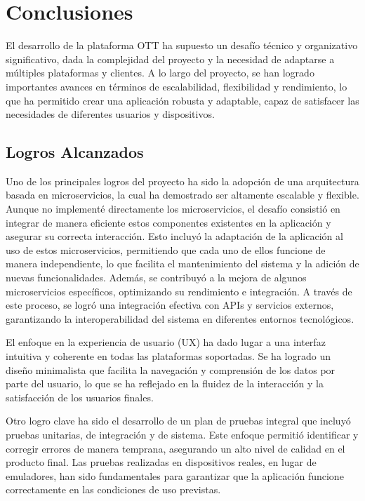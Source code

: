\chapter{Conclusiones}
\label{chap:conclusiones}

El desarrollo de la plataforma OTT ha supuesto un desafío técnico y organizativo significativo, dada la complejidad del 
proyecto y la necesidad de adaptarse a múltiples plataformas y clientes. A lo largo del proyecto, se han logrado 
importantes avances en términos de escalabilidad, flexibilidad y rendimiento, lo que ha permitido crear una aplicación 
robusta y adaptable, capaz de satisfacer las necesidades de diferentes usuarios y dispositivos.

\section{Logros Alcanzados}
\label{sec:conclusiones:logros}

Uno de los principales logros del proyecto ha sido la adopción de una arquitectura basada en microservicios, 
la cual ha demostrado ser altamente escalable y flexible. Aunque no implementé directamente los microservicios, el 
desafío consistió en integrar de manera eficiente estos componentes existentes en la aplicación y asegurar su correcta 
interacción. Esto incluyó la adaptación de la aplicación al uso de estos microservicios, permitiendo que cada uno de 
ellos funcione de manera independiente, lo que facilita el mantenimiento del sistema y la adición de nuevas funcionalidades.
Además, se contribuyó a la mejora de algunos microservicios específicos, optimizando su rendimiento e integración. 
A través de este proceso, se logró una integración efectiva con APIs y servicios externos, garantizando la interoperabilidad 
del sistema en diferentes entornos tecnológicos.

El enfoque en la experiencia de usuario (UX) ha dado lugar a una interfaz intuitiva y coherente en todas las plataformas 
soportadas. Se ha logrado un diseño minimalista que facilita la navegación y comprensión de los datos por parte del usuario, 
lo que se ha reflejado en la fluidez de la interacción y la satisfacción de los usuarios finales.

Otro logro clave ha sido el desarrollo de un plan de pruebas integral que incluyó pruebas unitarias, de integración y de 
sistema. Este enfoque permitió identificar y corregir errores de manera temprana, asegurando un alto nivel de calidad 
en el producto final. Las pruebas realizadas en dispositivos reales, en lugar de emuladores, han sido fundamentales para 
garantizar que la aplicación funcione correctamente en las condiciones de uso previstas.

